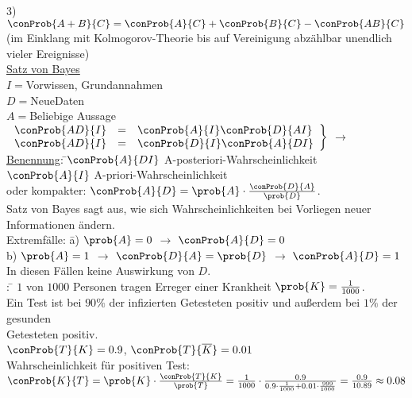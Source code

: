 \begin{tabbing}
3) \> $\conProb{A + B}{C} = \conProb{A}{C} + \conProb{B}{C} - \conProb{AB}{C}$\\
(im Einklang mit Kolmogorov-Theorie bis auf Vereinigung abzählbar unendlich vieler Ereignisse)\\
\underline{Satz von Bayes}\\
$I =$Vorwissen, Grundannahmen\\
$D=$NeueDaten\\
$A=$Beliebige Aussage\\
$\left. \begin{array}{r@ {\quad = \quad} l} \conProb{AD}{I} & \conProb{A}{I}\conProb{D}{AI}\\\conProb{AD}{I} & \conProb{D}{I}\conProb{A}{DI}\end{array}\right\}$ $\rightarrow$ \\
\underline{Benennung}: \=$\conProb{A}{DI}$ A-posteriori-Wahrscheinlichkeit\\
\> $\conProb{A}{I}$ A-priori-Wahrscheinlichkeit\\
oder kompakter: $\conProb{A}{D} = \prob{A}\cdot\frac{\conProb{D}{A}}{\prob{D}}$.\\
Satz von Bayes sagt aus, wie sich Wahrscheinlichkeiten bei Vorliegen neuer Informationen ändern.\\
Extremfälle: \= a) $\prob{A} = 0$ $\rightarrow$ $\conProb{A}{D} = 0$\\
\> b) $\prob{A} = 1$ $\rightarrow$ $\conProb{D}{A} = \prob{D}$ $\rightarrow$ $\conProb{A}{D} = 1$\\
\> In diesen Fällen keine Auswirkung von $D$.\\
: \= $1$ von $1000$ Personen tragen Erreger einer Krankheit $\prob{K} = \frac{1}{1000}$.\\
\> Ein Test ist bei $90\%$ der infizierten Getesteten positiv und außerdem bei $1\%$ der gesunden\\\> Getesteten positiv.\\
\> $\conProb{T}{K} = 0.9$, $\conProb{T}{\overline{K}} = 0.01$\\
\> Wahrscheinlichkeit für positiven Test:\\
\> $\conProb{K}{T} = \prob{K}\cdot\frac{\conProb{T}{K}}{\prob{T}} = \frac{1}{1000}\cdot\frac{0.9}{0.9\cdot\frac{1}{1000} + 0.01\cdot\frac{999}{1000}} = \frac{0.9}{10.89} \approx 0.08$
\end{tabbing}


